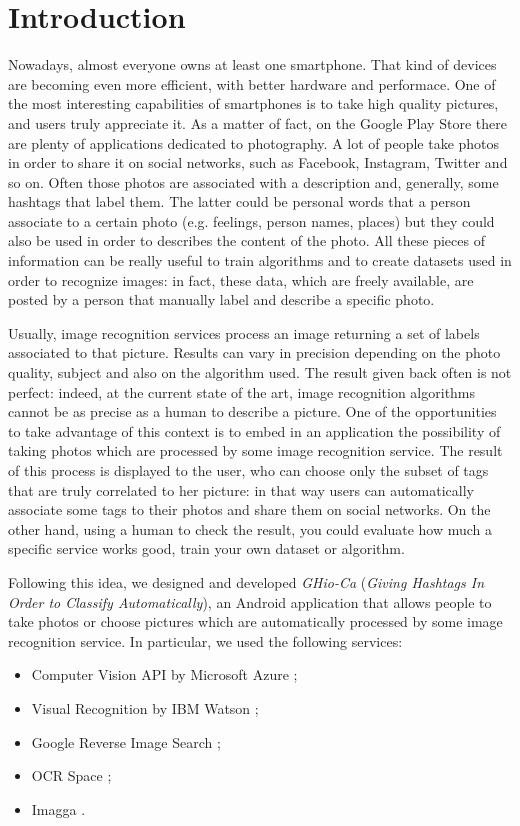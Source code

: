 \section{Introduction}
\label{sec:introduction}

Nowadays, almost everyone owns at least one smartphone. That kind of devices 
are becoming even more efficient, with better hardware and performace. One of 
the most interesting capabilities of smartphones is to take high quality 
pictures, and users truly appreciate it. As a matter of fact, on the Google Play 
Store there are plenty of applications dedicated to photography.
A lot of people take photos in order to share it on social networks, such as 
Facebook, Instagram, Twitter and so on. Often those photos are associated with 
a description and, generally, some hashtags that label them. The latter could 
be personal words that a person associate to a certain photo (e.g. feelings, 
person names, places) but they could also be used in order to describes the 
content of the photo.
All these pieces of information can be really useful to train algorithms and to 
create datasets used in order to recognize images: in fact, these data, which 
are freely available, are posted by a person that manually label and describe a 
specific photo.

Usually, image recognition services process an image returning a set of labels 
associated to that picture. Results can vary in precision depending on the photo 
quality, subject and also on the algorithm used.
The result given back often is not perfect: indeed, at the current state of the 
art, image recognition algorithms cannot be as precise as a human to describe a 
picture.
One of the opportunities to take advantage of this context is to embed in an 
application the possibility of taking photos which are processed by some image 
recognition service. The result of this process is displayed to the user, 
who can choose only the subset of tags that are truly correlated to her 
picture: in that way users can automatically associate some tags to their 
photos and share them on social networks. On the other hand, using a human to 
check the result, you could evaluate how much a specific service works good, 
train your own dataset or algorithm.

Following this idea, we designed and developed \textit{GHio-Ca} (\textit{Giving 
Hashtags In Order to Classify Automatically}), an Android application that 
allows people to take photos or choose pictures which are automatically 
processed by some image recognition service. In particular, we used the 
following services:
\begin{itemize}
  \item Computer Vision API by Microsoft Azure \cite{Microsoft};
  \item Visual Recognition by IBM Watson \cite{IBM};
  \item Google Reverse Image Search \cite{Google};
  \item OCR Space \cite{OCR};
  \item Imagga \cite{Imagga}.
\end{itemize}

